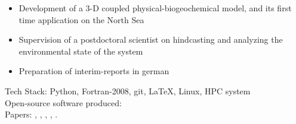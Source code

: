 \documentclass[
	a4paper,
]{fortysecondscv}
\begin{document}
\begin{cvtable}[1.5]
{{\begin{itemize}[leftmargin=*]
        \item Development of a 3-D coupled physical-biogeochemical model, and its first time application on the North Sea
        \item Supervision of a postdoctoral scientist on hindcasting and analyzing the environmental state of the system
        \item Preparation of interim-reports in german
    \end{itemize}}
      Tech Stack: Python, Fortran-2008, git, \LaTeX, Linux, HPC system\\
      Open-source software produced: 
      \href{https://github.com/OnurKerimoglu/FABM-GPM}{\color{pblue}{FABM-GPM}}\\
      Papers:
      \href{https://doi.org/10.3389/fmars.2019.00370}{\color{pblue}{1}}, 
      \href{https://doi.org/10.1029/2019JC015987}{\color{pblue}{2}}, 
      \href{https://doi.org/10.5194/bg-17-5097-2020}{\color{pblue}{3}}, 
      \href{https://doi.org/10.3389/fmars.2021.596126}{\color{pblue}{4}}, 
      \href{https://doi.org/10.3389/fmars.2021.637483}{\color{pblue}{5}}.
      }
      
      
\end{cvtable}
\end{document}
